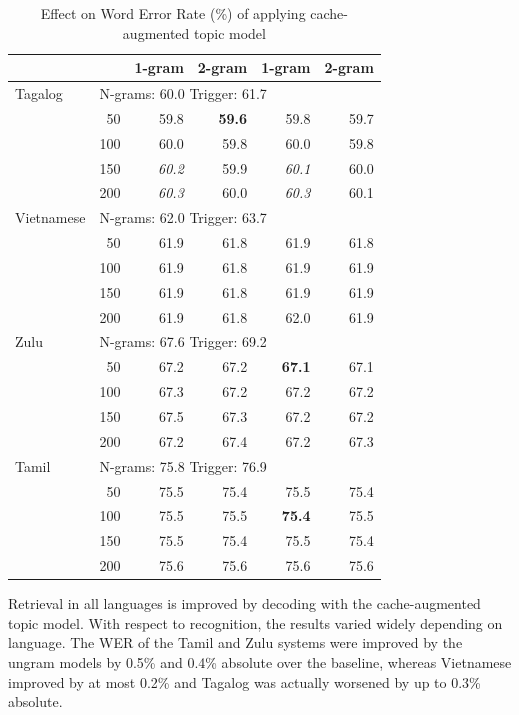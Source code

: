 \begin{table}
\begin{tabular}{lrrrrr}
   & & 1-gram & 2-gram & 1-gram &  2-gram \\ \midrule 
   Tagalog & \multicolumn{5}{l}{ N-grams: 60.0 \hfill Trigger: 61.7 } \\ 
	 & 50 & 59.8 & \textbf{59.6} & 59.8 & 59.7 \\ 
	  & 100 & 60.0  & 59.8 & 60.0& 59.8 \\
	  & 150 & \textit{60.2} & 59.9 & \textit{60.1} & 60.0\\
	  & 200 & \textit{60.3} & 60.0 & \textit{60.3}  & 60.1\\ \midrule 
	Vietnamese & \multicolumn{5}{l}{ N-grams: 62.0 \hfill Trigger: 63.7 } \\ 
	  & 50 & 61.9 & 61.8 & 61.9 & 61.8 \\
	  & 100 & 61.9 & 61.8 & 61.9  & 61.9 \\
	  & 150 & 61.9 & 61.8 & 61.9 & 61.9 \\
	  & 200 & 61.9 & 61.8 & 62.0 & 61.9\\ \midrule 
	Zulu & \multicolumn{5}{l}{ N-grams: 67.6 \hfill Trigger: 69.2 } \\ 
   \rowcolor{blue!5} & 50& 67.2 & 67.2 & \textbf{67.1} & 67.1 \\
	& 100 & 67.3 & 67.2 & 67.2 &  67.2 \\
	& 150 & 67.5 & 67.3 & 67.2 & 67.2 \\
	& 200 & 67.2 & 67.4 & 67.2 & 67.3 \\ \midrule 
	Tamil & \multicolumn{5}{l}{ N-grams: 75.8 \hfill Trigger: 76.9 } \\
	 & 50 & 75.5 & 75.4 & 75.5 & 75.4 \\ 
   \rowcolor{blue!5} & 100 & 75.5 & 75.5 & \textbf{75.4} & 75.5 \\
	& 150 & 75.5 & 75.4 & 75.5 & 75.4 \\
	& 200 & 75.6 & 75.6 & 75.6 & 75.6 \\\bottomrule
	
    \end{tabular}    
\caption[Effect of cache-augmented topic model on WER]{Effect on Word Error Rate (\%) of applying cache-augmented topic model \label{fig7:WER}}
\end{table}

Retrieval in all languages is improved by decoding with the cache-augmented topic model.  With respect to recognition, the results varied widely depending on language.   The WER of the Tamil and Zulu systems were improved by the ungram models by 0.5\% and 0.4\% absolute over the baseline, whereas Vietnamese improved by at most 0.2\% and Tagalog was actually worsened by up to 0.3\% absolute.   %

